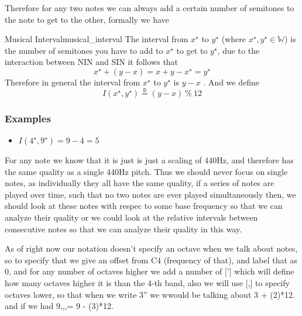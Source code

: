 Therefore for any two notes we can always add a certain number of semitones to the note to get to the other, formally we have

\begin{definition}{Musical Interval}{musical_interval}
    The interval from  $ x^{\star}$ to $ y ^{\star}$ (where $ x^{\star}, y^{\star} \in \mathbb{W}$) is the number of semitones you have to add to $ x^{\star}$ to get to $ y^{\star}$, due to the interaction between NIN and SIN it follows that 
  \[
  x^{\star}  +  \left( y  -  x \right) = x  +  y  -  x^{\star} = y^{\star}
  \]
  Therefore in general the interval from $ x^{\star}$  to $ y^{\star}$ is $y  - x$ . And we define 
  \[
  I\left( x^{\star}, y^{\star}\right) \stackrel{\mathtt{D}}{=} (y  -  x) ~\%~ 12
  \]
  \subsubsection*{Examples}
  \begin{itemize}
    \item $I\left( 4^{\star}, 9^{\star}\right) = 9  -  4 = 5$ 
  \end{itemize}
\end{definition}

For any note we know that it is just is just a scaling of 440Hz, and therefore has the same quality as a single 440Hz pitch. Thus we should never focus on single notes, as individually they all have the same quality, if a series of notes are played over time, such that no two notes are ever played simultaneously then, we should look at these notes with respec to some base frequency so that we can analyze their quality or we could look at the relative intervals between consecutive notes so that we can analyze their quality in this way.

As of right now our notation doesn't specify an octave when we talk about notes, so to specify that we give an offset from C4 (frequency of that), and label that as 0, and for any number of octaves higher we add a number of ['] which will define how many octaves higher it is than the 4-th band, also we will use [,] to specify octaves lower, so that when we write 3'' we wwould be talking about 3 + (2)*12. and if we had 9,,,= 9 - (3)*12.
